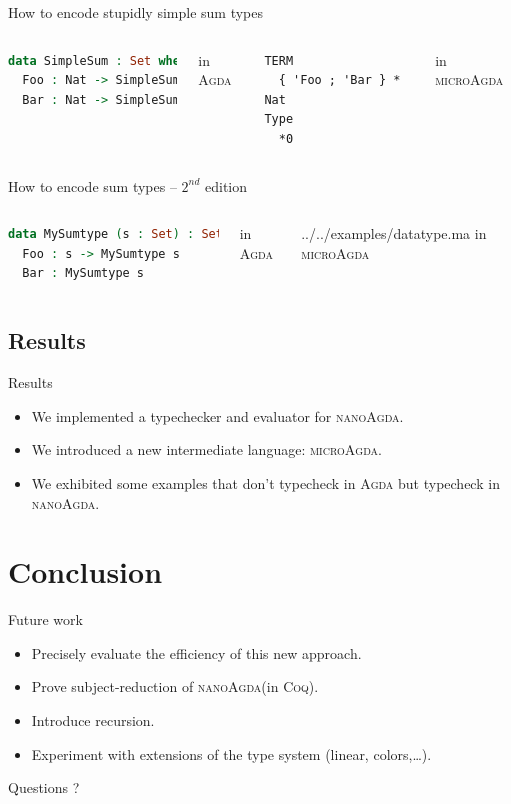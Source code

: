 \documentclass[xcolor=svgnames,11pt]{beamer}
\newcommand{\coq}{\textsc{Coq}\xspace}
\newcommand{\agda}{\textsc{Agda}\xspace}
\newcommand{\ma}{\textsc{microAgda}\xspace}
\newcommand{\na}{\textsc{nanoAgda}\xspace}
\begin{document}
\begin{frame}[fragile]{How to encode stupidly simple sum types}
\begin{columns}
\begin{lstlisting}[language=Agda]
data SimpleSum : Set where
  Foo : Nat -> SimpleSum
  Bar : Nat -> SimpleSum
\end{lstlisting}
\centering in \agda
{}
\begin{lstlisting}[language=nanoAgda]
TERM
  { 'Foo ; 'Bar } * Nat
Type
  *0
\end{lstlisting}
\centering in \ma
\end{columns}
\end{frame}

\begin{frame}[fragile]{How to encode sum types -- $2^{nd}$ edition}
\begin{columns}
\begin{lstlisting}[language=Agda]
data MySumtype (s : Set) : Set where
  Foo : s -> MySumtype s
  Bar : MySumtype s
\end{lstlisting}
\centering in \agda
{}

{../../examples/datatype.ma}
\centering in \ma
\end{columns}
\end{frame}

\subsection{Results}
\begin{frame}{Results}
\begin{itemize}
\item We implemented a typechecker and evaluator for \na.
\item We introduced a new intermediate language: \ma.
\item We exhibited some examples that don't typecheck in \agda but typecheck in \na.
\end{itemize}
\end{frame}

\section{Conclusion}
\begin{frame}{Future work}
\begin{itemize}
\item Precisely evaluate the efficiency of this new approach.
\item Prove subject-reduction of \na (in \coq).
\item Introduce recursion.
\item Experiment with extensions of the type system (linear, colors,\dots).
\end{itemize}
\end{frame}

\begin{frame}[plain]
  \begin{center}
    \Huge Questions ?
  \end{center}
\end{frame}
\end{document}
